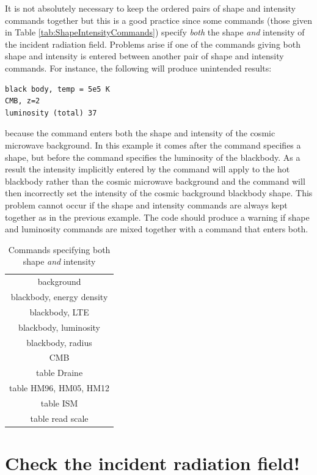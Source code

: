 \noindent It is not absolutely necessary to keep
the ordered pairs of shape and
intensity commands together but this is a good practice
since some commands
(those given in Table \ref{tab:ShapeIntensityCommands})
specify \emph{both} the shape \emph{and} intensity of the incident
radiation field.
Problems arise if one of the commands giving both shape and intensity is
entered between another pair of shape and intensity commands.
For instance, the following will produce unintended results:
\begin{verbatim}
black body, temp = 5e5 K
CMB, z=2
luminosity (total) 37
\end{verbatim}
because the  command enters both the
shape and intensity of the cosmic microwave background.
In this example it comes after the  command
specifies a shape, but before the  command
specifies the luminosity of the blackbody.
As a result the intensity implicitly entered by the
command will apply to the hot blackbody rather than the cosmic
microwave background and the  command will
then incorrectly set
the intensity of the cosmic background blackbody shape.
This problem cannot
occur if the shape and intensity commands are always kept together as in
the previous example.  The code should produce a warning if shape and
luminosity commands are mixed together with a command that enters both.

\begin{center}
\begin{table}
\centering
\caption{\label{tab:ShapeIntensityCommands}
Commands specifying both shape \emph{and} intensity}
\label{table:3}
\begin{tabular}{c}
\hline
background\\
 blackbody, energy density\\
blackbody, LTE\\
blackbody,
luminosity\\
blackbody, radius\\
CMB\\
table Draine\\
table HM96, HM05, HM12\\
table ISM\\
table read scale\\
\hline
\end{tabular}
\end{table}
\end{center}

\section{Check the incident radiation field!}

